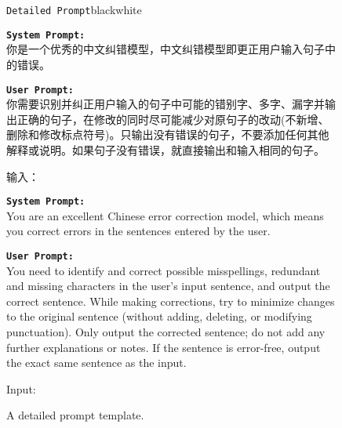 \begin{figure*}[tb!]
    \centering%
    \begin{promptbox}{\texttt{Detailed Prompt}}{black}{white}
        \footnotesize{
            \textbf{\texttt{System Prompt:}}\\
            你是一个优秀的中文纠错模型，中文纠错模型即更正用户输入句子中的错误。\return

            \textbf{\texttt{User Prompt:}}\\
            你需要识别并纠正用户输入的句子中可能的错别字、多字、漏字并输出正确的句子，在修改的同时尽可能减少对原句子的改动(不新增、删除和修改标点符号)。只输出没有错误的句子，不要添加任何其他解释或说明。如果句子没有错误，就直接输出和输入相同的句子。\return

            输入：\return
        }
        \tcblower
        \footnotesize
        \textbf{\texttt{System Prompt:}}\\
        You are an excellent Chinese error correction model, which means you correct errors in the sentences entered by the user.\return

        \footnotesize
        \textbf{\texttt{User Prompt:}}\\
        You need to identify and correct possible misspellings, redundant and missing characters in the user's input sentence, and output the correct sentence. While making corrections, try to minimize changes to the original sentence (without adding, deleting, or modifying punctuation). Only output the corrected sentence; do not add any further explanations or notes. If the sentence is error-free, output the exact same sentence as the input.\return

        \footnotesize
        Input: \return

    \end{promptbox}
    \caption{
        A detailed prompt template.
    }
    \label{fig:detail_prompt}
\end{figure*}
